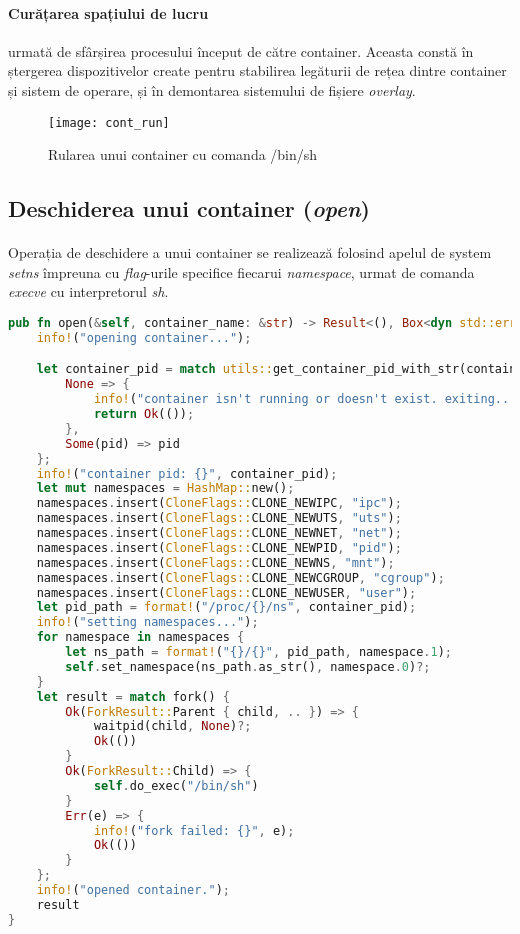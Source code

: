            \paragraph{Curățarea spațiului de lucru} urmată de sfârșirea procesului început de către container. Aceasta constă în ștergerea dispozitivelor create pentru stabilirea legăturii de rețea dintre container și sistem de operare, și în demontarea sistemului de fișiere \textit{overlay}.

            \begin{figure}[h!]
                \centering
                \texttt{[image: cont\_run]}
                \caption{Rularea unui container cu comanda /bin/sh}
                \label{fig:run}
            \end{figure}

        \pagebreak
        \subsection{Deschiderea unui container (\textit{open})}
            \paragraph{} Operația de deschidere a unui container se realizează folosind apelul de system \textit{setns} împreuna cu \textit{flag}-urile specifice fiecarui \textit{namespace}, urmat de comanda \textit{execve} cu interpretorul \textit{sh}.
                \begin{lstlisting}[language=Rust, style=boxed, caption={Deschiderea unui container},captionpos=b]
pub fn open(&self, container_name: &str) -> Result<(), Box<dyn std::error::Error>> {
    info!("opening container...");

    let container_pid = match utils::get_container_pid_with_str(container_name).unwrap() {
        None => {
            info!("container isn't running or doesn't exist. exiting...");
            return Ok(());
        },
        Some(pid) => pid
    };
    info!("container pid: {}", container_pid);
    let mut namespaces = HashMap::new();
    namespaces.insert(CloneFlags::CLONE_NEWIPC, "ipc");
    namespaces.insert(CloneFlags::CLONE_NEWUTS, "uts");
    namespaces.insert(CloneFlags::CLONE_NEWNET, "net");
    namespaces.insert(CloneFlags::CLONE_NEWPID, "pid");
    namespaces.insert(CloneFlags::CLONE_NEWNS, "mnt");
    namespaces.insert(CloneFlags::CLONE_NEWCGROUP, "cgroup");
    namespaces.insert(CloneFlags::CLONE_NEWUSER, "user");
    let pid_path = format!("/proc/{}/ns", container_pid);
    info!("setting namespaces...");
    for namespace in namespaces {
        let ns_path = format!("{}/{}", pid_path, namespace.1);
        self.set_namespace(ns_path.as_str(), namespace.0)?;
    }
    let result = match fork() {
        Ok(ForkResult::Parent { child, .. }) => {
            waitpid(child, None)?;
            Ok(())
        }
        Ok(ForkResult::Child) => {
            self.do_exec("/bin/sh")
        }
        Err(e) => {
            info!("fork failed: {}", e);
            Ok(())
        }
    };
    info!("opened container.");
    result
}                \end{lstlisting}
                \label{fig:cod_ccreate}

